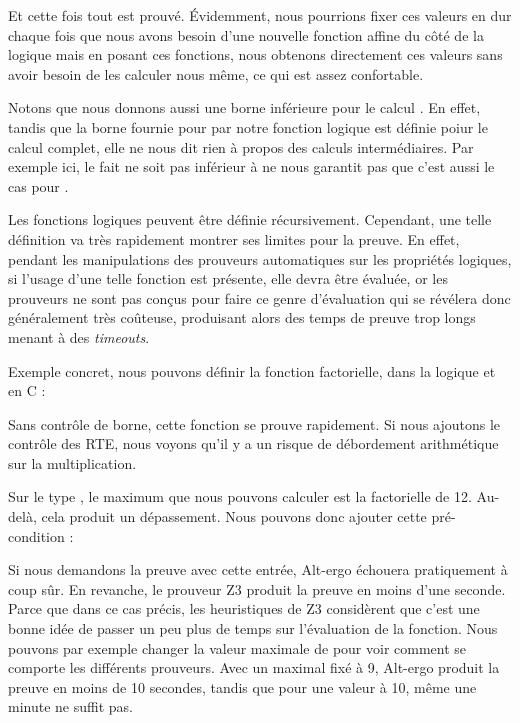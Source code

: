 Et cette fois tout est prouvé. Évidemment, nous pourrions fixer ces valeurs en 
dur chaque fois que nous avons besoin d'une nouvelle fonction affine du côté de
la logique mais en posant ces fonctions, nous obtenons directement ces valeurs 
sans avoir besoin de les calculer nous même, ce qui est assez confortable.


Notons que nous donnons aussi une borne inférieure pour le calcul .
En effet, tandis que la borne fournie pour  par notre fonction logique
est définie poiur le calcul complet, elle ne nous dit rien à propos des calculs
intermédiaires. Par exemple ici, le fait  ne soit pas inférieur
à  ne nous garantit pas que c'est aussi le cas pour
.





Les fonctions logiques peuvent être définie récursivement. Cependant, une telle
définition va très rapidement montrer ses limites pour la preuve. En effet, 
pendant les manipulations des prouveurs automatiques sur les propriétés 
logiques, si l'usage d'une telle fonction est présente, elle devra être évaluée,
or les prouveurs ne sont pas conçus pour faire ce genre d'évaluation qui se 
révélera donc généralement très coûteuse, produisant alors des temps de preuve
trop longs menant à des \textit{timeouts}.



Exemple concret, nous pouvons définir la fonction factorielle, dans la logique
et en C :






Sans contrôle de borne, cette fonction se prouve rapidement. Si nous ajoutons
le contrôle des RTE, nous voyons qu'il y a un risque de débordement
arithmétique sur la multiplication.



Sur le type , le maximum que nous pouvons calculer est la factorielle de 
12. Au-delà, cela produit un dépassement. Nous pouvons donc ajouter cette 
pré-condition :






Si nous demandons la preuve avec cette entrée, Alt-ergo échouera pratiquement à 
coup sûr. En revanche, le prouveur Z3 produit la preuve en moins d'une seconde.
Parce que dans ce cas précis, les heuristiques de Z3 considèrent que c'est une
bonne idée de passer un peu plus de temps sur l'évaluation de la fonction. Nous
pouvons par exemple changer la valeur maximale de  pour voir comment se 
comporte les différents prouveurs. Avec un  maximal fixé à 9, Alt-ergo produit
la preuve en moins de 10 secondes, tandis que pour une valeur à 10, même une 
minute ne suffit pas.



